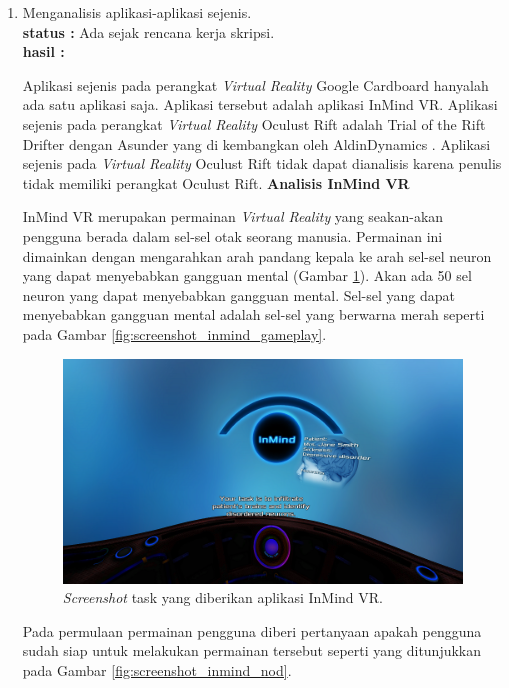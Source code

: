 \documentclass[a4paper,twoside]{article}
\begin{document}
\begin{enumerate}
		\item Menganalisis aplikasi-aplikasi sejenis.\\
		{\bf status :} Ada sejak rencana kerja skripsi.\\
		{\bf hasil :}



Aplikasi sejenis pada perangkat \textit{Virtual Reality} Google Cardboard hanyalah ada satu aplikasi saja. Aplikasi tersebut adalah aplikasi InMind VR. Aplikasi sejenis pada perangkat \textit{Virtual Reality} Oculust Rift adalah Trial of the Rift Drifter dengan Asunder yang di kembangkan oleh AldinDynamics \cite{aldin_dynamics}. Aplikasi sejenis pada \textit{Virtual Reality} Oculust Rift tidak dapat dianalisis karena penulis tidak memiliki perangkat Oculust Rift. 
\textbf{Analisis InMind VR}

InMind VR merupakan permainan \textit{Virtual Reality} yang seakan-akan pengguna berada dalam sel-sel otak seorang manusia. Permainan ini dimainkan dengan mengarahkan arah pandang kepala ke arah sel-sel neuron yang dapat menyebabkan gangguan mental (Gambar \ref{fig:screenshot_inmind_task}). Akan ada 50 sel neuron yang dapat menyebabkan gangguan mental. Sel-sel yang dapat menyebabkan gangguan mental adalah sel-sel yang berwarna merah seperti pada Gambar \ref{fig:screenshot_inmind_gameplay}.

\begin{figure}[htbp]
\centering
\includegraphics[scale=0.6]{Gambar/screenshot-inmind-task.png}
\caption{\textit{Screenshot} task yang diberikan aplikasi InMind VR.}
\label{fig:screenshot_inmind_task}
\end{figure}

Pada permulaan permainan pengguna diberi pertanyaan apakah pengguna sudah siap untuk melakukan permainan tersebut seperti yang ditunjukkan pada Gambar \ref{fig:screenshot_inmind_nod}.


\end{enumerate}
\end{document}
